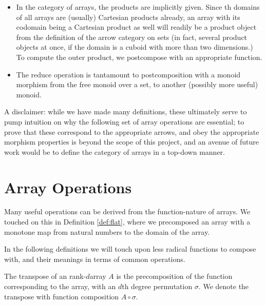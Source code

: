 \documentclass{DIKU-report-variant}
\begin{document}
\begin{observation}
  \label{ob:category-of-arrays}

  \begin{itemize}
    \item In the category of arrays, the products are implicitly given. Since th domains
      of all arrays are (usually) Cartesian products already, an array with its codomain being
      a Cartesian product as well will readily be a product object from the definition of
      the arrow category on sets (in fact, several product objects
      at once, if the domain is a cuboid with more than two dimensions.) To compute the outer
      product, we postcompose with an appropriate function.

    \item The reduce operation is tantamount to postcomposition with a
      monoid morphism from the free monoid over a set, to another (possibly more useful) monoid.
  \end{itemize}
\end{observation}

A disclaimer: while we have made many definitions, these ultimately
serve to pump intuition on why the following set of array operations
are essential; to prove that these correspond to the appropriate arrows,
and obey the appropriate morphism properties is beyond the scope of this
project, and an avenue of future work would be to define the category of
arrays in a top-down manner.

\section{Array Operations}
\label{sec:array-operations}

\begin{remark}
  \label{rem:functions}
  Many useful operations can be derived from the function-nature of arrays. We touched
  on this in Definition \ref{def:flat}, where we precomposed an array with a monotone map
  from natural numbers to the domain of the array.

  In the following definitions we will touch upon less radical functions
  to compose with, and their meanings in terms of common operations.
\end{remark}

\begin{definition}
  \label{def:transpose}
  The transpose of an rank-\(d\)array \(A\) is the precomposition
  of the function corresponding to the array, with an \(d\)th degree permutation \(\sigma\).
  We denote the transpose with function composition \(A \circ \sigma\).
\end{definition}
\end{document}
